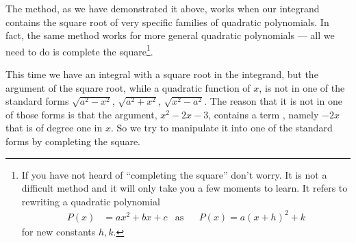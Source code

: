 The method, as we have demonstrated it above, works when our integrand contains the
square root of very specific families of quadratic polynomials. In fact, the same
method works for more general quadratic polynomials --- all we need to do is complete
the square\footnote{If you have not heard of ``completing the square'' don't worry. It
is not a difficult method and it will only take you a few moments to learn. It refers to
rewriting a quadratic polynomial
\begin{align*}
  P(x) &= ax^2 + bx + c &\text{as}&& P(x)= a(x+h)^2 +k
\end{align*}
for new constants $h,k$.
}.
\begin{eg}\label{eg:INVTRIGc}
This time we have an integral with a square root in the integrand, but
the argument of the square root, while a quadratic function of $x$, is not in
one of the standard forms $\sqrt{a^2-x^2}$, $\sqrt{a^2+x^2}$, $\sqrt{x^2-a^2}$.
The reason that it is not in one of those forms is that the argument,
$x^2-2x-3$, contains a term , namely $-2x$ that is of degree one in $x$.
So we try to manipulate it into one of the standard forms by completing
the square.


\end{eg}
